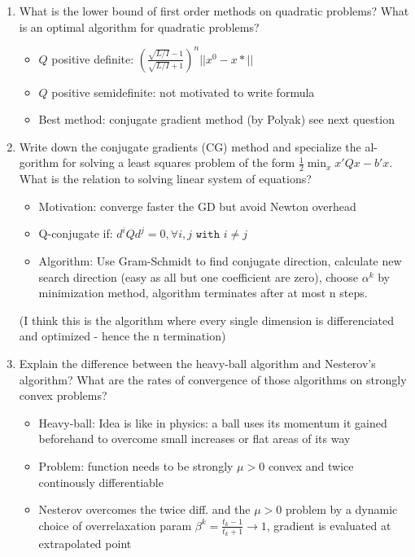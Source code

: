 \documentclass{report}
\newcommand{\question}[1]{{\small\textsf{#1}}}
\begin{document}
\begin{enumerate}
\item \question{What is the lower bound of first order methods on quadratic problems?  What is an
    optimal algorithm for quadratic problems?}
  \begin{itemize}
	\item $Q$ positive definite: $\left(\frac{\sqrt{L/I}-1}{\sqrt{L/I} + 1}\right)^n || x^0  - x* ||$
	\item $Q$ positive semidefinite: not motivated to write formula
	\item Best method: conjugate gradient method (by Polyak) see next question
\end{itemize}
\item \question{Write down the conjugate gradients (CG) method and specialize the al- gorithm for
    solving a least squares problem of the form \(\frac{1}{2} \min_x x'Qx - b'x\). What is the
    relation to solving linear system of equations?}
  \begin{itemize}
	\item Motivation: converge faster the GD but avoid Newton overhead
	\item Q-conjugate if: $d^i  Q d^j = 0, \forall i, j \texttt{ with } i \neq j$
	\item Algorithm: 
	Use Gram-Schmidt to find conjugate direction, calculate new search direction (easy as all but one coefficient are zero), choose $\alpha^k$ by minimization method, algorithm terminates after at most n steps. 
\end{itemize}
(I think this is the algorithm where every single dimension is differenciated and optimized - hence the n termination)
\item \question{Explain the difference between the heavy-ball algorithm and Nesterov’s algorithm?
    What are the rates of convergence of those algorithms on strongly convex problems?}
  \begin{itemize}
  \item Heavy-ball: Idea is like in physics: a ball uses its momentum it gained beforehand to overcome small increases or flat areas of its way
  \item Problem: function needs to be strongly $\mu > 0$ convex and twice continously differentiable
  \item Nesterov overcomes the twice diff. and the $\mu > 0$ problem by a dynamic choice of overrelaxation param $\beta^k = \frac{t_k - 1}{t_k + 1} \rightarrow 1$, gradient is evaluated at extrapolated point

\end{itemize}
\end{enumerate}
\end{document}

